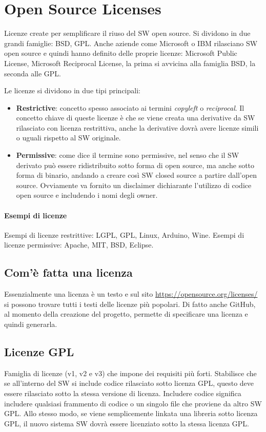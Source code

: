 \documentclass[10pt,a4paper]{book}
\begin{document}
\section{Open Source Licenses}
Licenze create per semplificare il riuso del SW open source. Si dividono in due grandi famiglie: BSD, GPL. Anche aziende come Microsoft o IBM rilasciano SW open source e quindi hanno definito delle proprie licenze: Microsoft Public License, Microsoft Reciprocal License, la prima si avvicina alla famiglia BSD, la seconda alle GPL.

Le licenze si dividono in due tipi principali: 
\begin{itemize}
\item \textbf{Restrictive}: concetto spesso associato ai termini \textit{copyleft} o \textit{reciprocal}. Il concetto chiave di queste licenze è che se viene creata una derivative da SW rilasciato con licenza restrittiva, anche la derivative dovrà avere licenze simili o uguali rispetto al SW originale.
\item \textbf{Permissive}: come dice il termine sono permissive, nel senso che il SW derivato può essere ridistribuito sotto forma di open source, ma anche sotto forma di binario, andando a creare così SW closed source a partire dall'open source. Ovviamente va fornito un disclaimer dichiarante l'utilizzo di codice open source e includendo i nomi degli owner.
\end{itemize}

\paragraph{Esempi di licenze}
Esempi di licenze restrittive: LGPL, GPL, Linux, Arduino, Wine.
Esempi di licenze permissive: Apache, MIT, BSD, Eclipse.

\subsection{Com'è fatta una licenza}
Essenzialmente una licenza è un testo e sul sito \url{https://opensource.org/licenses/} si possono trovare tutti i testi delle licenze più popolari. Di fatto anche GitHub, al momento della creazione del progetto, permette di specificare una licenza e quindi generarla.

\subsection{Licenze GPL}
Famiglia di licenze (v1, v2 e v3) che impone dei requisiti più forti. Stabilisce che se all'interno del SW si include codice rilasciato sotto licenza GPL, questo deve essere rilasciato sotto la stessa versione di licenza. Includere codice significa includere qualsiasi frammento di codice o un singolo file che proviene da altro SW GPL.
Allo stesso modo, se viene semplicemente linkata una libreria sotto licenza GPL, il nuovo sistema SW dovrà essere licenziato sotto la stessa licenza GPL. 
\end{document}

